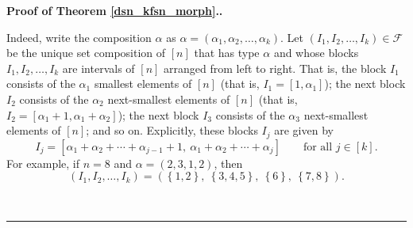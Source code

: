 \documentclass[12pt]{article}
\theoremstyle{definition}%
\theoremstyle{definition}%
\theoremstyle{remark}%
\newcommand{\tup}[1]{\left( #1 \right)}
\newcommand{\interval}[1]{\left[ #1 \right]} %
\newcommand{\set}[1]{\left\{ #1 \right\}}
\newcommand{\CF}{\mathcal{F}}
\newenvironment{proof}[1][Proof]{\noindent\textbf{#1.} }{\ \rule{0.5em}{0.5em}}
\begin{document}
\begin{proof}[Proof of Theorem \ref{dsn_kfsn_morph}.]
\begin{enumerate}
Indeed, write the composition $\alpha$ as $\alpha=\left(  \alpha_{1}%
,\alpha_{2},\ldots,\alpha_{k}\right)$. Let $\left(  I_{1},I_{2},\ldots
,I_{k}\right)  \in\CF$ be the unique set composition of $\interval{n}$
that has type $\alpha$ and whose blocks $I_{1},I_{2},\ldots,I_{k}$
are intervals of $\interval{n}$ arranged from left to right. That is,
the block $I_{1}$ consists of the $\alpha_{1}$ smallest elements of
$\interval{n}$ (that is, $I_{1}= \interval{1,\alpha_1}$); the next block
$I_{2}$ consists of the $\alpha_{2}$ next-smallest elements of
$\interval{n}$ (that is, $I_{2}= \interval{ \alpha_{1}+1,\alpha_{1}+\alpha
_{2} }$); the next block $I_{3}$ consists of the $\alpha_{3}$
next-smallest elements of $\interval{n}$; and so on. Explicitly, these
blocks $I_{j}$ are given by
\[
I_{j}
= \interval{ \alpha_{1}+\alpha_{2}+\cdots+\alpha_{j-1}+1,
           \ \alpha_{1}+\alpha_{2}+\cdots+\alpha_{j} }
\qquad\text{for all } j \in \interval{k} .
\]
For example, if $n = 8$ and $\alpha = \tup{2,3,1,2}$, then
\[
\tup{I_1,I_2,\ldots,I_k}
= \tup{\set{1,2},\ \set{3,4,5},\ \set{6},\ \set{7,8}}.
\]


\end{enumerate}
\end{proof}
\end{document}
